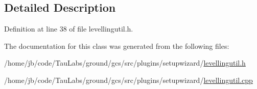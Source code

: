 \subsection{\-Detailed \-Description}


\-Definition at line 38 of file levellingutil.\-h.



\-The documentation for this class was generated from the following files\-:\begin{DoxyCompactItemize}
\item 
/home/jb/code/\-Tau\-Labs/ground/gcs/src/plugins/setupwizard/\hyperlink{levellingutil_8h}{levellingutil.\-h}\item 
/home/jb/code/\-Tau\-Labs/ground/gcs/src/plugins/setupwizard/\hyperlink{levellingutil_8cpp}{levellingutil.\-cpp}\end{DoxyCompactItemize}
